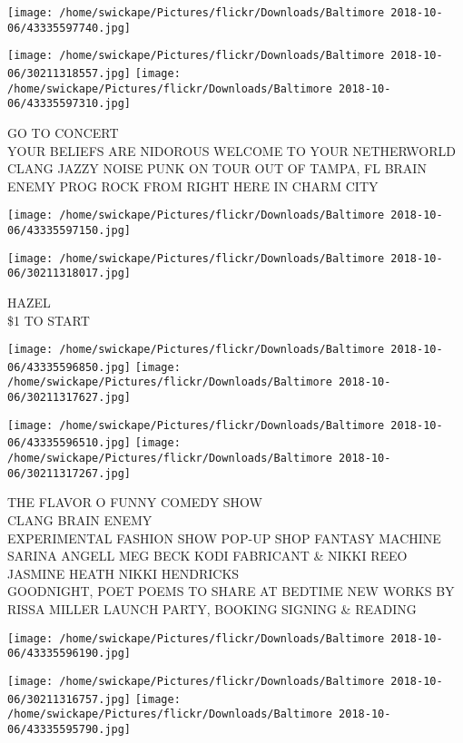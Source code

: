 \documentclass[10pt,letterpaper]{article}
\begin{document}
\texttt{[image: /home/swickape/Pictures/flickr/Downloads/Baltimore 2018-10-06/43335597740.jpg]}

\vspace{0.25in}
\texttt{[image: /home/swickape/Pictures/flickr/Downloads/Baltimore 2018-10-06/30211318557.jpg]}
\texttt{[image: /home/swickape/Pictures/flickr/Downloads/Baltimore 2018-10-06/43335597310.jpg]}

GO TO CONCERT\\
YOUR BELIEFS ARE NIDOROUS WELCOME TO YOUR NETHERWORLD\\
CLANG JAZZY NOISE PUNK ON TOUR OUT OF TAMPA, FL BRAIN ENEMY PROG ROCK FROM RIGHT HERE IN CHARM CITY\\
\pagebreak

\texttt{[image: /home/swickape/Pictures/flickr/Downloads/Baltimore 2018-10-06/43335597150.jpg]}

\vspace{0.25in}
\texttt{[image: /home/swickape/Pictures/flickr/Downloads/Baltimore 2018-10-06/30211318017.jpg]}

HAZEL\\
\$1 TO START\\
\pagebreak

\texttt{[image: /home/swickape/Pictures/flickr/Downloads/Baltimore 2018-10-06/43335596850.jpg]}
\texttt{[image: /home/swickape/Pictures/flickr/Downloads/Baltimore 2018-10-06/30211317627.jpg]}

\texttt{[image: /home/swickape/Pictures/flickr/Downloads/Baltimore 2018-10-06/43335596510.jpg]}
\texttt{[image: /home/swickape/Pictures/flickr/Downloads/Baltimore 2018-10-06/30211317267.jpg]}

THE FLAVOR O FUNNY COMEDY SHOW\\
CLANG BRAIN ENEMY\\
EXPERIMENTAL FASHION SHOW POP{-}UP SHOP FANTASY MACHINE SARINA ANGELL MEG BECK KODI FABRICANT \& NIKKI  REEO JASMINE HEATH NIKKI HENDRICKS\\
GOODNIGHT, POET POEMS TO SHARE AT BEDTIME NEW WORKS BY RISSA MILLER LAUNCH PARTY, BOOKING SIGNING \& READING\\
\pagebreak

\texttt{[image: /home/swickape/Pictures/flickr/Downloads/Baltimore 2018-10-06/43335596190.jpg]}

\vspace{0.25in}
\texttt{[image: /home/swickape/Pictures/flickr/Downloads/Baltimore 2018-10-06/30211316757.jpg]}
\texttt{[image: /home/swickape/Pictures/flickr/Downloads/Baltimore 2018-10-06/43335595790.jpg]}
\end{document}
